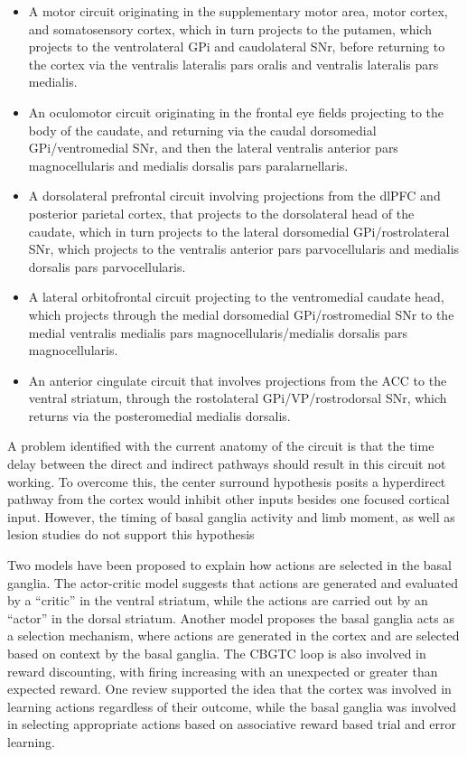 \begin{itemize}
\tightlist
\item
  A motor circuit originating in the supplementary motor area, motor cortex, and somatosensory cortex, which in turn projects to the putamen, which projects to the ventrolateral GPi and caudolateral SNr, before returning to the cortex via the ventralis lateralis pars oralis and ventralis lateralis pars medialis.
\item
  An oculomotor circuit originating in the frontal eye fields projecting to the body of the caudate, and returning via the caudal dorsomedial GPi/ventromedial SNr, and then the lateral ventralis anterior pars magnocellularis and medialis dorsalis pars paralarnellaris.
\item
  A dorsolateral prefrontal circuit involving projections from the dlPFC and posterior parietal cortex, that projects to the dorsolateral head of the caudate, which in turn projects to the lateral dorsomedial GPi/rostrolateral SNr, which projects to the ventralis anterior pars parvocellularis and medialis dorsalis pars parvocellularis.
\item
  A lateral orbitofrontal circuit projecting to the ventromedial caudate head, which projects through the medial dorsomedial GPi/rostromedial SNr to the medial ventralis medialis pars magnocellularis/medialis dorsalis pars magnocellularis.
\item
  An anterior cingulate circuit that involves projections from the ACC to the ventral striatum, through the rostolateral GPi/VP/rostrodorsal SNr, which returns via the posteromedial medialis dorsalis.
\end{itemize}

A problem identified with the current anatomy of the circuit is that the time delay between the direct and indirect pathways should result in this circuit not working. To overcome this, the center surround hypothesis posits a hyperdirect pathway from the cortex would inhibit other inputs besides one focused cortical input. However, the timing of basal ganglia activity and limb moment, as well as lesion studies do not support this hypothesis

Two models have been proposed to explain how actions are selected in the basal ganglia. The actor-critic model suggests that actions are generated and evaluated by a ``critic'' in the ventral striatum, while the actions are carried out by an ``actor'' in the dorsal striatum. Another model proposes the basal ganglia acts as a selection mechanism, where actions are generated in the cortex and are selected based on context by the basal ganglia. The CBGTC loop is also involved in reward discounting, with firing increasing with an unexpected or greater than expected reward. One review supported the idea that the cortex was involved in learning actions regardless of their outcome, while the basal ganglia was involved in selecting appropriate actions based on associative reward based trial and error learning.

